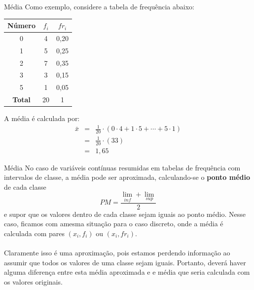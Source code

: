 \documentclass[10pt]{beamer}\usepackage[]{graphicx}\usepackage[]{color}
\theoremstyle{definition}
\begin{document}
\begin{frame}{Média}
  Como exemplo, considere a tabela de frequência abaixo:
  \begin{table}[h]
    \centering
    \begin{tabular}{ccc}
      \hline
      \textbf{Número} & \textbf{$f_i$} & \textbf{$fr_i$} \\
      \hline
      0 & 4 & 0,20 \\
      1 & 5 & 0,25 \\
      2 & 7 & 0,35 \\
      3 & 3 & 0,15 \\
      5 & 1 & 0,05 \\
      \hline
      \textbf{Total} & 20 & 1 \\
      \hline
    \end{tabular}
  \end{table}
  A média é calculada por:
  \begin{eqnarray*}
    \bar{x} &=& \frac{1}{20} \cdot (0 \cdot 4 + 1 \cdot 5 + \cdots + 5 \cdot 1)\\
            &=& \frac{1}{20} \cdot (33)\\
            &=& 1,65
  \end{eqnarray*}
\end{frame}

\begin{frame}{Média}
  No caso de variáveis contínuas resumidas em tabelas de frequência com
  intervalos de classe, a média pode ser aproximada, calculando-se o
  \textbf{ponto médio} de cada classe
  \begin{equation*}
    PM = \frac{\lim_{inf} + \lim_{sup}}{2}
  \end{equation*}
  e supor que os valores dentro de cada classe sejam iguais ao ponto
  médio. Nesse caso, ficamos com amesma situação para o caso discreto,
  onde a média é calculada com pares $(x_i, f_i)$ ou $(x_i, fr_i)$. \\~\\

  Claramente isso é uma aproximação, pois estamos perdendo informação ao
  assumir que todos os valores de uma classe sejam iguais. Portanto,
  deverá haver alguma diferença entre esta média aproximada e e média
  que seria calculada com os valores originais.
\end{frame}
\end{document}
